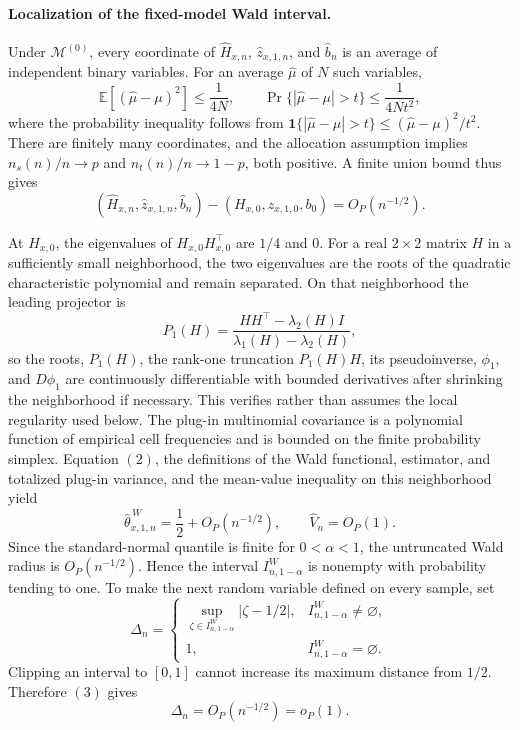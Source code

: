 \paragraph{Localization of the fixed-model Wald interval.}
Under \(\mathcal M^{(0)}\), every coordinate of \(\widehat H_{x,n}\), \(\widehat z_{x,1,n}\), and \(\widehat b_n\) is an average of independent binary variables. For an average \(\widehat\mu\) of \(N\) such variables,
\[
\mathbb E[(\widehat\mu-\mu)^2]\le\frac1{4N},
\qquad
\Pr\{|\widehat\mu-\mu|>t\}
\le\frac{1}{4Nt^2},
\]
where the probability inequality follows from
\(\mathbf 1\{|\widehat\mu-\mu|>t\}\le(\widehat\mu-\mu)^2/t^2\).
There are finitely many coordinates, and the allocation assumption implies \(n_s(n)/n\to p\) and \(n_t(n)/n\to1-p\), both positive. A finite union bound thus gives
\[
(\widehat H_{x,n},\widehat z_{x,1,n},\widehat b_n)
-(H_{x,0},z_{x,1,0},b_0)=O_P(n^{-1/2}). \tag{2}
\]

At \(H_{x,0}\), the eigenvalues of \(H_{x,0}H_{x,0}^{\top}\) are \(1/4\) and \(0\). For a real \(2\times2\) matrix \(H\) in a sufficiently small neighborhood, the two eigenvalues are the roots of the quadratic characteristic polynomial and remain separated. On that neighborhood the leading projector is
\[
P_1(H)=\frac{HH^{\top}-\lambda_2(H)I}{\lambda_1(H)-\lambda_2(H)},
\]
so the roots, \(P_1(H)\), the rank-one truncation \(P_1(H)H\), its pseudoinverse, \(\phi_1\), and \(D\phi_1\) are continuously differentiable with bounded derivatives after shrinking the neighborhood if necessary. This verifies rather than assumes the local regularity used below. The plug-in multinomial covariance is a polynomial function of empirical cell frequencies and is bounded on the finite probability simplex. Equation \((2)\), the definitions of the Wald functional, estimator, and totalized plug-in variance, and the mean-value inequality on this neighborhood yield
\[
\widehat\theta^{\,W}_{x,1,n}=\frac12+O_P(n^{-1/2}),
\qquad
\widehat V_n=O_P(1). \tag{3}
\]
Since the standard-normal quantile is finite for \(0<\alpha<1\), the untruncated Wald radius is \(O_P(n^{-1/2})\). Hence the interval \(I^W_{n,1-\alpha}\) is nonempty with probability tending to one. To make the next random variable defined on every sample, set
\[
\Delta_n=
\begin{cases}
\displaystyle\sup_{\zeta\in I^W_{n,1-\alpha}}|\zeta-1/2|,
&I^W_{n,1-\alpha}\ne\varnothing,\\
1,&I^W_{n,1-\alpha}=\varnothing.
\end{cases}
\]
Clipping an interval to \([0,1]\) cannot increase its maximum distance from \(1/2\). Therefore \((3)\) gives
\[
\Delta_n=O_P(n^{-1/2})=o_P(1). \tag{4}
\]

